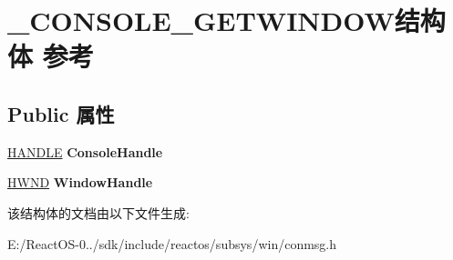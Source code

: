 \hypertarget{struct___c_o_n_s_o_l_e___g_e_t_w_i_n_d_o_w}{}\section{\+\_\+\+C\+O\+N\+S\+O\+L\+E\+\_\+\+G\+E\+T\+W\+I\+N\+D\+O\+W结构体 参考}
\label{struct___c_o_n_s_o_l_e___g_e_t_w_i_n_d_o_w}
\subsection*{Public 属性}
\begin{DoxyCompactItemize}
\item 
\mbox{\label{struct___c_o_n_s_o_l_e___g_e_t_w_i_n_d_o_w_a67677f9136f42ff56acafcda7a19d7c7}} 
\hyperlink{interfacevoid}{H\+A\+N\+D\+LE} {\bfseries Console\+Handle}
\item 
\mbox{\label{struct___c_o_n_s_o_l_e___g_e_t_w_i_n_d_o_w_afb51e9aacf6788a786522b11ef6a28af}} 
\hyperlink{interfacevoid}{H\+W\+ND} {\bfseries Window\+Handle}
\end{DoxyCompactItemize}


该结构体的文档由以下文件生成\+:\begin{DoxyCompactItemize}
\item 
E\+:/\+React\+O\+S-\/0../sdk/include/reactos/subsys/win/conmsg.\+h\end{DoxyCompactItemize}
